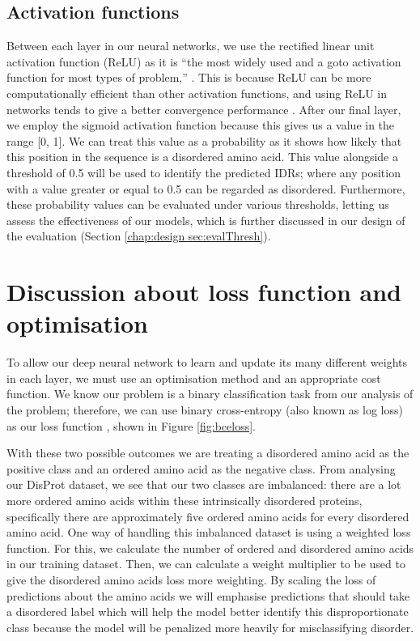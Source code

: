 \documentclass{l4proj}
\begin{document}
\subsection{Activation functions}
\label{chap:design section:activations}
Between each layer in our neural networks, we use the rectified linear unit activation function (ReLU) as it is “the most widely used and a goto activation function for most types of problem,” \citep{Keerthi:22}. This is because ReLU can be more computationally efficient than other activation functions, and using ReLU in networks tends to give a better convergence performance \citep{BerenLuthien:16}. After our final layer, we employ the sigmoid activation function because this gives us a value in the range [0, 1]. We can treat this value as a probability as it shows how likely that this position in the sequence is a disordered amino acid. This value alongside a threshold of 0.5 will be used to identify the predicted IDRs; where any position with a value greater or equal to 0.5 can be regarded as disordered. Furthermore, these probability values can be evaluated under various thresholds, letting us assess the effectiveness of our models, which is further discussed in our design of the evaluation (Section \ref{chap:design sec:evalThresh}).

\section{Discussion about loss function and optimisation}
\label{sec:loss design}
To allow our deep neural network to learn and update its many different weights in each layer, we must use an optimisation method and an appropriate cost function. We know our problem is a binary classification task from our analysis of the problem; therefore, we can use binary cross-entropy (also known as log loss) as our loss function \citep{Godoy:18}, shown in Figure \ref{fig:bceloss}.  

With these two possible outcomes we are treating a disordered amino acid as the positive class and an ordered amino acid as the negative class. From analysing our DisProt dataset, we see that our two classes are imbalanced: there are a lot more ordered amino acids within these intrinsically disordered proteins, specifically there are approximately five ordered amino acids for every disordered amino acid. One way of handling this imbalanced dataset is using a weighted loss function. For this, we calculate the number of ordered and disordered amino acids in our training dataset. Then, we can calculate a weight multiplier to be used to give the disordered amino acids loss more weighting. By scaling the loss of predictions about the amino acids we will emphasise predictions that should take a disordered label which will help the model better identify this disproportionate class because the model will be penalized more heavily for misclassifying disorder. 
\end{document}
